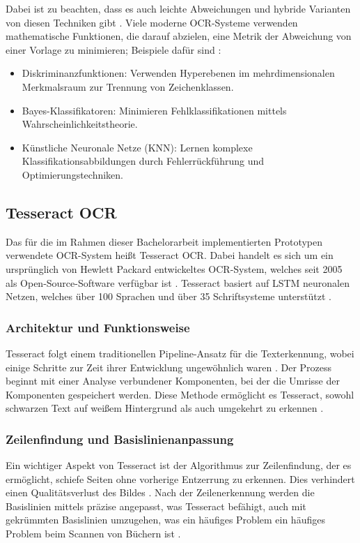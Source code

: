 Dabei ist zu beachten, dass es auch leichte Abweichungen und hybride Varianten von diesen Techniken gibt \cite{BorovikovEugene2014Asom}. Viele moderne \gls{OCR}-Systeme verwenden mathematische Funktionen, die darauf abzielen, eine Metrik der Abweichung von einer Vorlage zu minimieren; Beispiele dafür sind \cite{BorovikovEugene2014Asom}:

\begin{itemize}
    \item Diskriminanzfunktionen: Verwenden Hyperebenen im mehrdimensionalen Merkmalsraum zur Trennung von Zeichenklassen.
    \item Bayes-Klassifikatoren: Minimieren Fehlklassifikationen mittels Wahrscheinlichkeitstheorie.
    \item Künstliche Neuronale Netze (KNN): Lernen komplexe Klassifikationsabbildungen durch Fehlerrückführung und Optimierungstechniken.
\end{itemize}

\subsection{Tesseract OCR}
\label{subsec:tesseract-ocr}
Das für die im Rahmen dieser Bachelorarbeit implementierten Prototypen verwendete \gls{OCR}-System heißt Tesseract \gls{OCR}. Dabei handelt es sich um ein ursprünglich von Hewlett Packard entwickeltes \gls{OCR}-System, welches seit 2005 als Open-Source-Software verfügbar ist \cite{SmithR_2007_AOot}. Tesseract basiert auf \gls{LSTM} neuronalen Netzen, welches über 100 Sprachen und über 35 Schriftsysteme unterstützt \cite{tesseract_ocr_user_manual}. 

\subsubsection{Architektur und Funktionsweise}
\label{subsubsec:architektur-und-funktionsweise}
Tesseract folgt einem traditionellen Pipeline-Ansatz für die Texterkennung, wobei einige Schritte zur Zeit ihrer Entwicklung ungewöhnlich waren \cite{SmithR_2007_AOot}. Der Prozess beginnt mit einer Analyse verbundener Komponenten, bei der die Umrisse der Komponenten gespeichert werden. Diese Methode ermöglicht es Tesseract, sowohl schwarzen Text auf weißem Hintergrund als auch umgekehrt zu erkennen \cite{SmithR_2007_AOot}.

\subsubsection{Zeilenfindung und Basislinienanpassung}
\label{subsubsec:zeilenfindung-und-basislinienanpassung}
Ein wichtiger Aspekt von Tesseract ist der Algorithmus zur Zeilenfindung, der es ermöglicht, schiefe Seiten ohne vorherige Entzerrung zu erkennen. Dies verhindert einen Qualitätsverlust des Bildes \cite{SmithR_2007_AOot}. Nach der Zeilenerkennung werden die Basislinien mittels präzise angepasst, was Tesseract befähigt, auch mit gekrümmten Basislinien umzugehen, was ein häufiges Problem ein häufiges Problem beim Scannen von Büchern ist \cite{SmithR_2007_AOot}.

